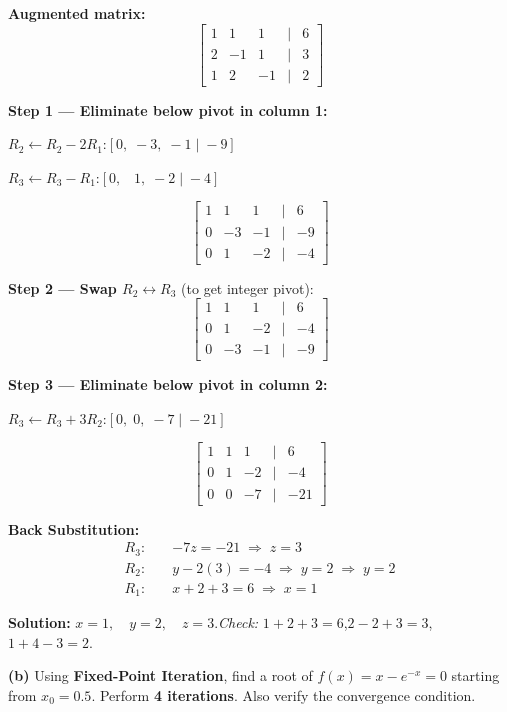 \documentclass[12pt]{article}
\begin{document}
\begin{ansbox}
\textbf{Augmented matrix:}
\[
  \begin{bmatrix} 1 & 1 & 1 & \big| & 6 \\ 2 & -1 & 1 & \big| & 3 \\ 1 & 2 & -1 & \big| & 2 \end{bmatrix}
\]

\textbf{Step 1 — Eliminate below pivot in column 1:}

$R_2 \leftarrow R_2 - 2R_1$:\quad $[0,\;-3,\;-1\;|\;-9]$

$R_3 \leftarrow R_3 - R_1$:\quad $[0,\;\;\;1,\;-2\;|\;-4]$

\[
  \begin{bmatrix} 1 & 1 & 1 & \big| & 6 \\ 0 & -3 & -1 & \big| & -9 \\ 0 & 1 & -2 & \big| & -4 \end{bmatrix}
\]

\textbf{Step 2 — Swap $R_2 \leftrightarrow R_3$} (to get integer pivot):
\[
  \begin{bmatrix} 1 & 1 & 1 & \big| & 6 \\ 0 & 1 & -2 & \big| & -4 \\ 0 & -3 & -1 & \big| & -9 \end{bmatrix}
\]

\textbf{Step 3 — Eliminate below pivot in column 2:}

$R_3 \leftarrow R_3 + 3R_2$:\quad $[0,\;0,\;-7\;|\;-21]$

\[
  \begin{bmatrix} 1 & 1 & 1 & \big| & 6 \\ 0 & 1 & -2 & \big| & -4 \\ 0 & 0 & -7 & \big| & -21 \end{bmatrix}
\]

\textbf{Back Substitution:}
\begin{align*}
  R_3:\quad &-7z = -21 \;\Rightarrow\; \boxed{z = 3}\\
  R_2:\quad &y - 2(3) = -4 \;\Rightarrow\; y = 2 \;\Rightarrow\; \boxed{y = 2}\\
  R_1:\quad &x + 2 + 3 = 6 \;\Rightarrow\; \boxed{x = 1}
\end{align*}

\textbf{Solution:} $x = 1,\quad y = 2,\quad z = 3$.\quad\textit{Check:} $1+2+3=6$\;\checkmark,\;$2-2+3=3$\;\checkmark,\;$1+4-3=2$\;\checkmark.
\end{ansbox}

\medskip
\textbf{(b)} Using \textbf{Fixed-Point Iteration}, find a root of $f(x) = x - e^{-x} = 0$ starting from $x_0 = 0.5$. Perform \textbf{4 iterations}. Also verify the convergence condition.
\end{document}
